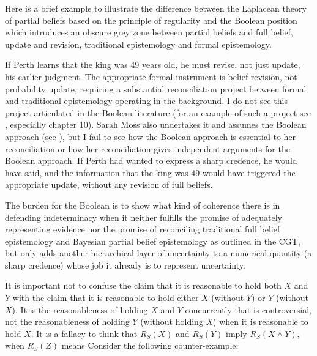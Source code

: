 \documentclass[11pt]{article}
\begin{document}
Here is a brief example to illustrate the difference between the
Laplacean theory of partial beliefs based on the principle of
regularity and the Boolean position which introduces an obscure grey
zone between partial beliefs and full belief, update and revision,
traditional epistemology and formal epistemology.


If Perth learns that the king was 49 years old, he must revise, not
just update, his earlier judgment. The appropriate formal instrument
is belief revision, not probability update, requiring a substantial
reconciliation project between formal and traditional epistemology
operating in the background. I do not see this project articulated in
the Boolean literature (for an example of such a project see
, especially chapter 10). Sarah Moss also
undertakes it and assumes the Boolean approach (see
), but I fail to see how the Boolean approach is
essential to her reconciliation or how her reconciliation gives
independent arguments for the Boolean approach. If Perth had wanted to
express a sharp credence, he would have said,  and the information that the king
was 49 would have triggered the appropriate update, without any
revision of full beliefs.

The burden for the Boolean is to show what kind of coherence there is
in defending indeterminacy when it neither fulfills the promise of
adequately representing evidence nor the promise of reconciling
traditional full belief  epistemology and Bayesian
partial belief epistemology as outlined in the CGT, but only adds
another hierarchical layer of uncertainty to a numerical quantity (a
sharp credence) whose job it already is to represent
uncertainty.

It is important not to confuse the claim that it is reasonable to hold
both $X$ and $Y$ with the claim that it is reasonable to hold either
$X$ (without $Y$) or $Y$ (without $X$). It is the reasonableness of
holding $X$ and $Y$ concurrently that is controversial, not the
reasonableness of holding $Y$ (without holding $X$) when it is
reasonable to hold $X$. It is a fallacy to think that $R_{S}(X)$ and
$R_{S}(Y)$ imply $R_{S}(X\wedge{}Y)$, when $R_{S}(Z)$ means  Consider the following
counter-example:
\end{document}
